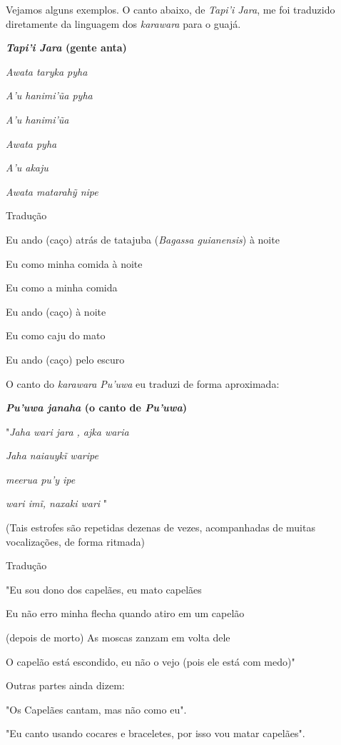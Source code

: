 Vejamos alguns exemplos. O canto abaixo, de \emph{Tapi'i Jara}, me foi
traduzido diretamente da linguagem dos \emph{karawara} para o guajá.

\textbf{\emph{Tapi'i Jara} (gente anta) }

\emph{Awata taryka pyha}

\emph{A'u hanimi'ũa pyha}

\emph{A'u hanimi'ũa}

\emph{Awata pyha}

\emph{A'u akaju}

\emph{Awata matarahỹ nipe}

Tradução

Eu ando (caço) atrás de tatajuba (\emph{Bagassa guianensis}) à noite

Eu como minha comida à noite

Eu como a minha comida

Eu ando (caço) à noite

Eu como caju do mato

Eu ando (caço) pelo escuro

O canto do \emph{karawara} \emph{Pu'uwa} eu traduzi de forma aproximada:

\textbf{\emph{Pu'uwa janaha} (o canto de \emph{Pu'uwa})}

"\emph{Jaha wari jara , ajka waria}

\emph{Jaha naiauykĩ waripe}

\emph{meerua pu'y ipe}

\emph{wari imĩ, naxaki wari} "

(Tais estrofes são repetidas dezenas de vezes, acompanhadas de muitas
vocalizações, de forma ritmada)

Tradução

"Eu sou dono dos capelães, eu mato capelães

Eu não erro minha flecha quando atiro em um capelão

(depois de morto) As moscas zanzam em volta dele

O capelão está escondido, eu não o vejo (pois ele está com medo)"

Outras partes ainda dizem:

"Os Capelães cantam, mas não como eu".

"Eu canto usando cocares e braceletes, por isso vou matar capelães".

